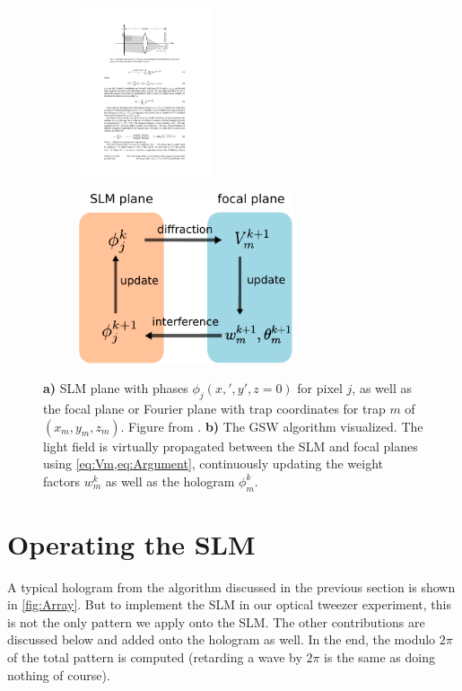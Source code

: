 \begin{figure}
\centering
	\begin{subfigure}{.56\textwidth}
		\centering
		\includegraphics[height=5cm]{figures/SLMgeometry.pdf}
		\caption{}
		\label{fig:SLMgeometry}
	\end{subfigure}
	\begin{subfigure}{.43\textwidth}
		\centering
		\includegraphics[height=5cm]{figures/WeightedGerschbergSaxton.pdf}
		\caption{}
		\label{fig:GSWalgorithm}
	\end{subfigure}
	\caption{\textbf{a)} SLM plane with phases $\phi_j(x,',y',z=0)$ for pixel $j$, as well as the focal plane or Fourier plane with trap coordinates for trap $m$ of $(x_m,y_m,z_m)$. 
	Figure from \cite{DiLeonardo2007}. 
	\textbf{b)} The \ac{GSW} algorithm visualized.
	The light field is virtually propagated between the SLM and focal planes using \cref{eq:Vm,eq:Argument}, continuously updating the weight factors $w_m^k$ as well as the hologram $\phi_m^k$.}
	\label{fig:GerschbergSaxton}
\end{figure}


\section{Operating the SLM}\label{sec:SLMoperatoin}

A typical hologram from the algorithm discussed in the previous section is shown in \cref{fig:Array}.
But to implement the SLM in our optical tweezer experiment, this is not the only pattern we apply onto the SLM.
The other contributions are discussed below and added onto the hologram as well.
In the end, the modulo $2\pi$ of the total pattern is computed (retarding a wave by $2\pi$ is the same as doing nothing of course).


